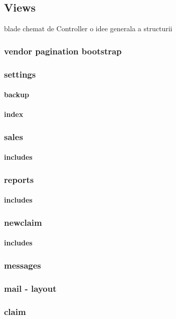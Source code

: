 \subsection{Views}
	blade chemat de Controller
	o idee generala a structurii
	\subsubsection{vendor pagination bootstrap}
	\subsubsection{settings}
		\paragraph{backup}
		\paragraph{index}
	\subsubsection{sales}
		\paragraph{includes}
	\subsubsection{reports}
		\paragraph{includes}
	\subsubsection{newclaim}
		\paragraph{includes}
	\subsubsection{messages}
	\subsubsection{mail - layout}
	\subsubsection{claim}
